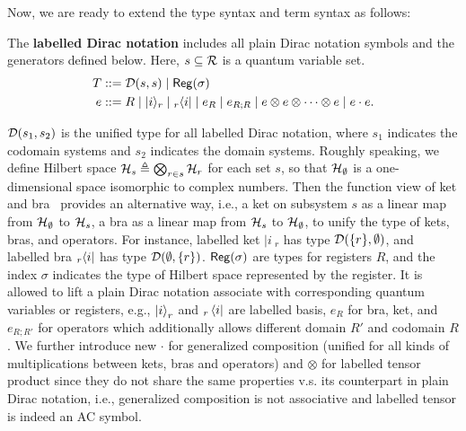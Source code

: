 Now, we are ready to extend the type syntax and term syntax as follows:
\begin{definition}
  The \textbf{labelled Dirac notation} includes all plain Dirac notation symbols and the generators defined below.
  Here, $s\subseteq \mathcal{R}$ is a quantum variable set.
  \begin{align*}
    T & ::= \mathcal{D}(s,s) \mid \mathsf{Reg}(\sigma) \\
    e & ::= R \mid |i\rangle_r \mid {}_r\langle i| \mid e_R \mid e_{R;R} \mid
    e \otimes e \otimes \cdots \otimes e \mid e \cdot e.
  \end{align*}
\end{definition}
$\mathcal{D}(s_1, s_2)$ is the unified type for all labelled Dirac notation, where $s_1$ indicates the codomain systems and $s_2$ indicates the domain systems.
Roughly speaking, we define Hilbert space ${\mathcal{H}}_s\triangleq\bigotimes_{r\in s}{\mathcal{H}}_r$ for each set $s$, so that ${\mathcal{H}}_{\emptyset}$ is a one-dimensional space isomorphic to complex numbers. Then the function view of ket and bra~\cite{Zhou2023} provides an alternative way, i.e., a ket on subsystem $s$ as a linear map from ${\mathcal{H}}_{\emptyset}$ to ${\mathcal{H}}_s$, a bra as a linear map from ${\mathcal{H}}_s$ to ${\mathcal{H}}_{\emptyset}$, to unify the type of kets, bras, and operators. For instance, labelled ket $|i\>_r$ has type $\mathcal{D}(\{r\}, \emptyset)$, and labelled bra ${}_r\langle i|$ has type $\mathcal{D}(\emptyset, \{r\})$.
$\mathsf{Reg}(\sigma)$ are types for registers $R$, and the index $\sigma$ indicates the type of Hilbert space represented by the register.
It is allowed to lift a plain Dirac notation associate with corresponding quantum variables or registers, e.g., $\ket{i}_r$ and ${}_r\bra{i}$ are labelled basis, $e_R$ for bra, ket, and $e_{R;R'}$ for operators which additionally allows different domain $R'$ and codomain $R$.
We further introduce new $\cdot$ for generalized composition (unified for all kinds of multiplications between kets, bras and operators) and $\otimes$ for labelled tensor product since they do not share the same properties v.s. its counterpart in plain Dirac notation, i.e., generalized composition is not associative and labelled tensor is indeed an AC symbol.

